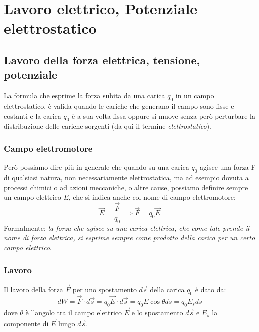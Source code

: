 \documentclass[class=book, crop=false, oneside, 12pt]{standalone}
\begin{document}
\chapter{Lavoro elettrico, Potenziale elettrostatico}

\section{Lavoro della forza elettrica, tensione, potenziale}

La formula che esprime la forza subita da una carica \(q_0\) in un campo elettrostatico, è valida quando le cariche che generano il campo sono fisse e costanti e la carica \(q_0\) è a sua volta fissa oppure si muove senza però perturbare la distribuzione delle cariche sorgenti (da qui il termine \emph{elettrostatico}).

\subsection{Campo elettromotore}

Però possiamo dire più in generale che quando su una carica \(q_0\) agisce una forza F di qualsiasi natura, non necessariamente elettrostatica, ma ad esempio dovuta a processi chimici o ad azioni meccaniche, o altre cause, possiamo definire sempre un campo elettrico \(E\), che si indica anche col nome di campo elettromotore:
\begin{equation} \label{campo_elettromotore}
    \overrightarrow{E} = \frac{\overrightarrow{F}}{q_0} \implies \overrightarrow{F} = q_0 \overrightarrow{E}
\end{equation}
Formalmente: \emph{la forza che agisce su una carica elettrica, che come tale prende il nome di forza elettrica, si esprime sempre come prodotto della carica per un certo campo elettrico}.

\subsection{Lavoro}

Il lavoro della forza \(\overrightarrow{F}\) per uno spostamento \(d \overrightarrow{s}\) della carica \(q_0\) è dato da:
\begin{equation}
    d W = \overrightarrow{F} \cdot d \overrightarrow{s} = q_0 \overrightarrow{E} \cdot d \overrightarrow{s} = q_0 E \cos \theta ds = q_0 E_s d s
\end{equation}
dove \(\theta\) è l'angolo tra il campo elettrico \(\overrightarrow{E}\) e lo spostamento \(d \overrightarrow{s}\) e \(E_s\) la componente di \(\overrightarrow{E}\) lungo \(d \overrightarrow{s}\).
\end{document}
